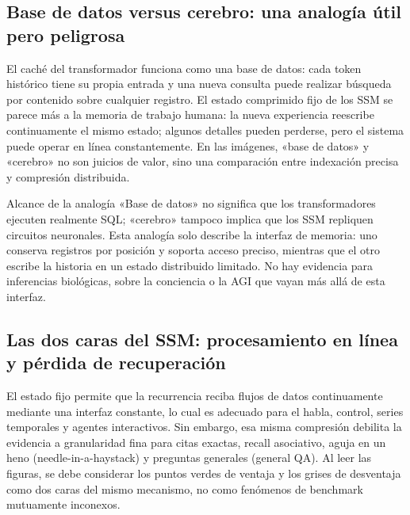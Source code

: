 \subsection{Base de datos versus cerebro: una analogía útil pero peligrosa}

El caché del transformador funciona como una base de datos: cada token histórico tiene su propia entrada y una nueva consulta puede realizar búsqueda por contenido sobre cualquier registro. El estado comprimido fijo de los SSM se parece más a la memoria de trabajo humana: la nueva experiencia reescribe continuamente el mismo estado; algunos detalles pueden perderse, pero el sistema puede operar en línea constantemente. En las imágenes, «base de datos» y «cerebro» no son juicios de valor, sino una comparación entre indexación precisa y compresión distribuida.



\begin{warningbox}{Alcance de la analogía}
«Base de datos» no significa que los transformadores ejecuten realmente SQL; «cerebro» tampoco implica que los SSM repliquen circuitos neuronales. Esta analogía solo describe la interfaz de memoria: uno conserva registros por posición y soporta acceso preciso, mientras que el otro escribe la historia en un estado distribuido limitado. No hay evidencia para inferencias biológicas, sobre la conciencia o la AGI que vayan más allá de esta interfaz.
\end{warningbox}

\subsection{Las dos caras del SSM: procesamiento en línea y pérdida de recuperación}

El estado fijo permite que la recurrencia reciba flujos de datos continuamente mediante una interfaz constante, lo cual es adecuado para el habla, control, series temporales y agentes interactivos. Sin embargo, esa misma compresión debilita la evidencia a granularidad fina para citas exactas, recall asociativo, aguja en un heno (needle-in-a-haystack) y preguntas generales (general QA). Al leer las figuras, se debe considerar los puntos verdes de ventaja y los grises de desventaja como dos caras del mismo mecanismo, no como fenómenos de benchmark mutuamente inconexos.


